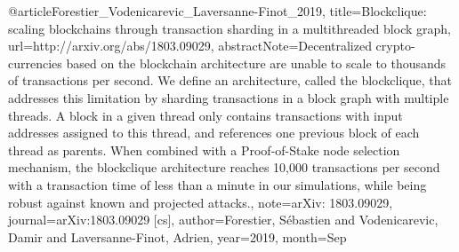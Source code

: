  @article{Forestier_Vodenicarevic_Laversanne-Finot_2019, title={Blockclique: scaling blockchains through transaction sharding in a multithreaded block graph}, url={http://arxiv.org/abs/1803.09029}, abstractNote={Decentralized crypto-currencies based on the blockchain architecture are unable to scale to thousands of transactions per second. We deﬁne an architecture, called the blockclique, that addresses this limitation by sharding transactions in a block graph with multiple threads. A block in a given thread only contains transactions with input addresses assigned to this thread, and references one previous block of each thread as parents. When combined with a Proof-of-Stake node selection mechanism, the blockclique architecture reaches 10,000 transactions per second with a transaction time of less than a minute in our simulations, while being robust against known and projected attacks.}, note={arXiv: 1803.09029}, journal={arXiv:1803.09029 [cs]}, author={Forestier, Sébastien and Vodenicarevic, Damir and Laversanne-Finot, Adrien}, year={2019}, month={Sep} }
